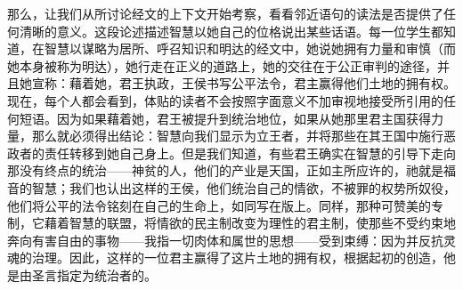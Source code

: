 那么，让我们从所讨论经文的上下文开始考察，看看邻近语句的读法是否提供了任何清晰的意义。这段论述描述智慧以她自己的位格说出某些话语。每一位学生都知道，在智慧以谋略为居所、呼召知识和明达的经文中，她说她拥有力量和审慎（而她本身被称为明达），她行走在正义的道路上，她的交往在于公正审判的途径，并且她宣称：藉着她，君王执政，王侯书写公平法令，君主赢得他们土地的拥有权。现在，每个人都会看到，体贴的读者不会按照字面意义不加审视地接受所引用的任何短语。因为如果藉着她，君王被提升到统治地位，如果从她那里君主国获得力量，那么就必须得出结论：智慧向我们显示为立王者，并将那些在其王国中施行恶政者的责任转移到她自己身上。但是我们知道，有些君王确实在智慧的引导下走向那没有终点的统治——神贫的人，他们的产业是天国，正如主所应许的，祂就是福音的智慧；我们也认出这样的王侯，他们统治自己的情欲，不被罪的权势所奴役，他们将公平的法令铭刻在自己的生命上，如同写在版上。同样，那种可赞美的专制，它藉着智慧的联盟，将情欲的民主制改变为理性的君主制，使那些不受约束地奔向有害自由的事物——我指一切肉体和属世的思想——受到束缚：因为并反抗灵魂的治理。因此，这样的一位君主赢得了这片土地的拥有权，根据起初的创造，他是由圣言指定为统治者的。\par

